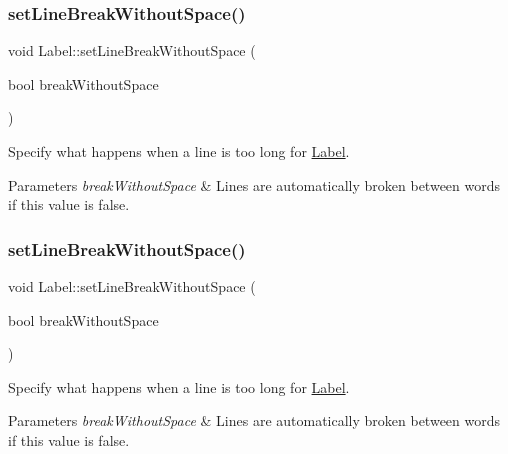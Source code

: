 \subsubsection{\texorpdfstring{set\+Line\+Break\+Without\+Space()}{setLineBreakWithoutSpace()}\hspace{0.1cm}{\footnotesize\ttfamily [1/2]}}
{\footnotesize\ttfamily void Label\+::set\+Line\+Break\+Without\+Space (\begin{DoxyParamCaption}\item[{bool}]{break\+Without\+Space }\end{DoxyParamCaption})}

Specify what happens when a line is too long for \hyperlink{classLabel}{Label}.


\begin{DoxyParams}{Parameters}
{\em break\+Without\+Space} & Lines are automatically broken between words if this value is false. \\
\hline
\end{DoxyParams}
\mbox{\label{classLabel_aa6ea9a4b8d81b4c14e44fdd3a862073f}} 
\subsubsection{\texorpdfstring{set\+Line\+Break\+Without\+Space()}{setLineBreakWithoutSpace()}\hspace{0.1cm}{\footnotesize\ttfamily [2/2]}}
{\footnotesize\ttfamily void Label\+::set\+Line\+Break\+Without\+Space (\begin{DoxyParamCaption}\item[{bool}]{break\+Without\+Space }\end{DoxyParamCaption})}

Specify what happens when a line is too long for \hyperlink{classLabel}{Label}.


\begin{DoxyParams}{Parameters}
{\em break\+Without\+Space} & Lines are automatically broken between words if this value is false. \\
\hline
\end{DoxyParams}
\mbox{\label{classLabel_acb0bd4b5aa05360a85f18def21cd7e4d}} 
